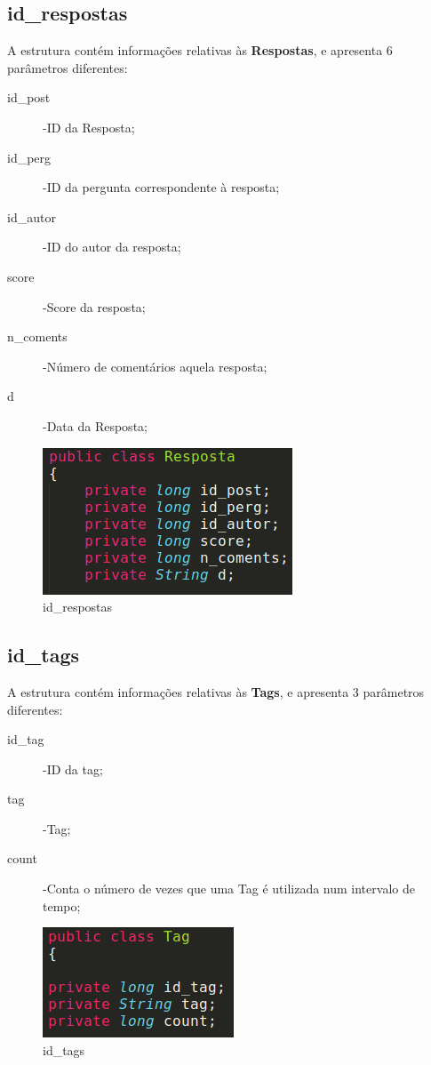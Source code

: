 \documentclass[a4paper]{article}
\begin{document}
	\subsection{id_respostas}
	A estrutura contém informações relativas às \textbf{Respostas}, e apresenta 6 parâmetros diferentes:

	\begin{description}
		\item[id_post] -ID da Resposta;
		\item[id_perg] -ID da pergunta correspondente à resposta;
		\item[id_autor] -ID do autor da resposta;
		\item[score] -Score da resposta;
		\item[n_coments] -Número de comentários aquela resposta;
		\item[d] -Data da Resposta;

	\end{description}


	

	\begin{figure}[H]
	\centering
	\includegraphics[scale =0.25]{respostas.png}
	\caption{id_respostas}
	\label{img:id_respostas}
	\end{figure}

	\subsection{id_tags}
	A estrutura contém informações relativas às \textbf{Tags}, e apresenta 3 parâmetros diferentes:

	\begin{description}
		\item[id_tag] -ID da tag;
		\item[tag] -Tag;
		\item[count] -Conta o número de vezes que uma Tag é utilizada num intervalo de tempo;
	\end{description}	


	\begin{figure}[H]
	\centering
	\includegraphics[scale =0.25]{tags.png}
	\caption{id_tags}
	\label{img:id_tags}
	\end{figure}
\end{document}
